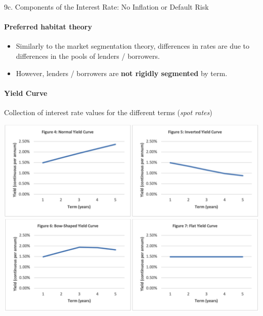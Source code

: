 \begin{CHPT_SUMM_AUTO}[label = {L.-9c}]{9c. Components of the Interest Rate: No Inflation or Default Risk}
\paragraph{Preferred habitat theory}
\begin{itemize}[leftmargin = *]
	\item	Similarly to the market segmentation theory, differences in rates are due to differences in the pools of lenders / borrowers.
	\item	However, lenders / borrowers are \textbf{not rigidly segmented} by term.
\end{itemize}

\tcbline

\paragraph{Yield Curve}	Collection of interest rate values for the different terms (\textit{spot rates})
\begin{center}
	\includegraphics[scale=0.3]{img/yield-curve-2.png}
	\includegraphics[scale=0.3]{img/yield-curve.png}
\end{center}
\end{CHPT_SUMM_AUTO}

